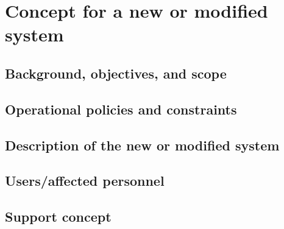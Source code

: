 
\chapter{Concept for a new or modified system}
\label{loc:Concept for a new or modified system}


\section{Background, objectives, and scope}
\label{loc:Background, objectives, and scope}


\section{Operational policies and constraints}
\label{loc:Operational policies and constraints}


\section{Description of the new or modified system}
\label{loc:Description of the new or modified system}


\section{Users/affected personnel}
\label{loc:Users/affected personnel}


\section{Support concept}
\label{loc:Support concept}

